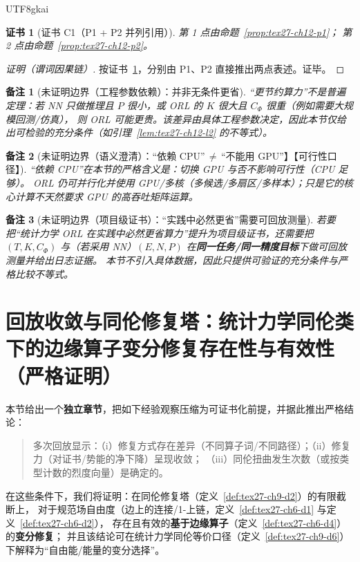 \documentclass[12pt]{article}
\newtheorem{remark}{备注}[section]
\newtheorem{Certificate}{证书}[section]
\begin{document}
\begin{CJK*}{UTF8}{gkai}
\begin{Certificate}[证书 C1（P1 + P2 并列引用）]
\label{cert:tex27-ch12-c1}
第 1 点由命题~\ref{prop:tex27-ch12-p1}；
第 2 点由命题~\ref{prop:tex27-ch12-p2}。
\end{Certificate}

\begin{proof}[证明（谓词因果链）]
按证书~\ref{cert:tex27-ch12-c1}，分别由 P1、P2 直接推出两点表述。证毕。
\end{proof}

\begin{remark}[未证明边界（工程参数依赖）：并非无条件更省]
\label{rem:tex27-ch12-r1}
“更节约算力”不是普遍定理：若 NN 只做推理且 $P$ 很小，或 ORL 的 $K$ 很大且 $C_\Phi$ 很重（例如需要大规模回测/仿真），
则 ORL 可能更贵。该差异由具体工程参数决定，因此本节仅给出可检验的充分条件（如引理~\ref{lem:tex27-ch12-l2} 的不等式）。
\end{remark}

\begin{remark}[未证明边界（语义澄清）：“依赖 CPU”\,$\neq$\,“不能用 GPU”】【可行性口径】]
\label{rem:tex27-ch12-r2}
“依赖 CPU”在本节的严格含义是：切换 GPU 与否不影响可行性（CPU 足够）。
ORL 仍可并行化并使用 GPU/多核（多候选/多扇区/多样本）；只是它的核心计算不天然要求 GPU 的高吞吐矩阵运算。
\end{remark}

\begin{remark}[未证明边界（项目级证书）：“实践中必然更省”需要可回放测量]
\label{rem:tex27-ch12-r3}
若要把“统计力学 ORL 在实践中必然更省算力”提升为项目级证书，还需要把
$(T,K,C_\Phi)$ 与（若采用 NN）$(E,N,P)$ 在\textbf{同一任务/同一精度目标}下做可回放测量并给出日志证据。
本节不引入具体数据，因此只提供可验证的充分条件与严格比较不等式。
\end{remark}

\section{回放收敛与同伦修复塔：统计力学同伦类下的边缘算子变分修复存在性与有效性（严格证明）}
\label{sec:tex27-ch13-replay-variational-repair}

本节给出一个\textbf{独立章节}，把如下经验观察压缩为可证书化前提，并据此推出严格结论：
\begin{quote}
  多次回放显示：（i）修复方式存在差异（不同算子词/不同路径）；（ii）修复力（对证书/势能的净下降）呈现收敛；
  （iii）同伦扭曲发生次数（或按类型计数的烈度向量）是确定的。
\end{quote}
在这些条件下，我们将证明：在同伦修复塔（定义~\ref{def:tex27-ch9-d2}）的有限截断上，
对于规范场自由度（边上的连接/1-上链，定义~\ref{def:tex27-ch6-d1} 与定义~\ref{def:tex27-ch6-d2}），
存在且有效的\textbf{基于边缘算子}（定义~\ref{def:tex27-ch6-d4}）的\textbf{变分修复}；
并且该结论可在统计力学同伦等价口径（定义~\ref{def:tex27-ch9-d6}）下解释为“自由能/能量的变分选择”。


\end{CJK*}
\end{document}
